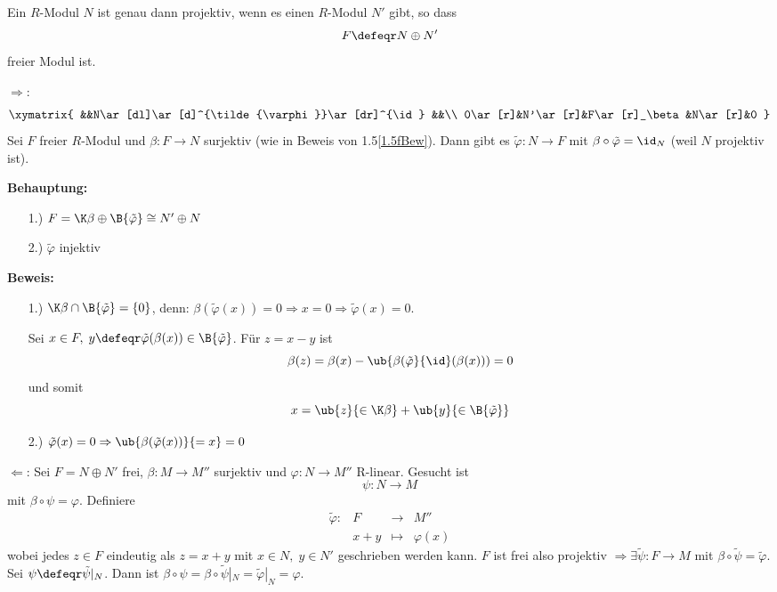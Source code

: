\begin{Prop}
\label{1.6}
  Ein $R$-Modul $N$ ist genau dann projektiv, wenn es einen $R$-Modul $N'$ gibt,
  so dass 
  \[
  F \defeqr N \oplus N'
  \]
  freier Modul ist.
\end{Prop}

\begin{Bew}
  \glqq$\Rightarrow$\grqq:
  \[\xymatrix{
  &&N\ar[dl]\ar[d]^{\tilde{\varphi}}\ar[dr]^{\id} &&\\
  0\ar[r]&N'\ar[r]&F\ar[r]_\beta&N\ar[r]&0 
  }\]
  Sei $F$ freier $R$-Modul und $\beta: F \to N$ surjektiv (wie in Beweis von
  1.5\ref{1.5fBew}). Dann gibt es $\tilde{\varphi}: N \to F$ mit $\beta \circ
  \tilde{\varphi} = \id_N$ (weil $N$ projektiv ist).

\textbf{Behauptung:}
  \begin{enumerate}
    \item[1.)] $F = \K\beta \oplus \B{\tilde{\varphi}} \cong
               N' \oplus N$
    \item[2.)] $\tilde{\varphi}$ injektiv
  \end{enumerate}
  \textbf{Beweis:}
  \begin{enumerate}
    \item[1.)] $\K\beta \cap \B{\tilde{\varphi}} = \{0\}$, denn:
               $\beta(\tilde{\varphi}(x)) = 0 \Rightarrow x = 0 \Rightarrow
               \tilde{\varphi}(x) = 0$.
  
               Sei $x \in F,\; y \defeqr
               \tilde{\varphi}(\beta(x)) \in \B{\tilde\varphi}$.
               Für $z = x - y$ ist
               \[
               \beta(z) = \beta(x) -
               \ub{\beta(\tilde{\varphi}}{\id}(\beta(x)))= 0
               \]
               und somit
               \[ 
               x = \ub{z}{\in
               \K\beta} + \ub{y}{\in \B{\tilde{\varphi}}}
               \]
    \item[2.)] $\tilde{\varphi}(x) = 0 \Rightarrow \ub{\beta(\tilde{\varphi}(x))}{= x} = 0$
  \end{enumerate}
  \glqq$\Leftarrow$\grqq:
  Sei $F = N \oplus N'$ frei, $\beta: M \to M''$ surjektiv und $\varphi: N \to
  M''$ R-linear. Gesucht ist 
  \[
  \psi: N \to M
  \]
  mit $\beta \circ \psi = \varphi$.
  Definiere 
  \[
  \begin{matrix}
  \tilde{\varphi}:& F& \to& M''\\
  &x + y &\mapsto&\varphi(x)
  \end{matrix}
  \]
  wobei jedes $z \in F$ eindeutig als $z = x + y$ mit $x \in N,\; y
  \in N'$ geschrieben werden kann.
  $F$ ist frei also projektiv $\Rightarrow \exists \tilde{\psi}: F \to M$ mit
  $\beta \circ \tilde{\psi} = \tilde{\varphi}$. Sei $\psi \defeqr
  \tilde{\psi}|_N$. Dann ist $\beta \circ \psi = \beta \circ \tilde{\psi}|_N =
  \tilde{\varphi}|_N = \varphi$.
\end{Bew}
